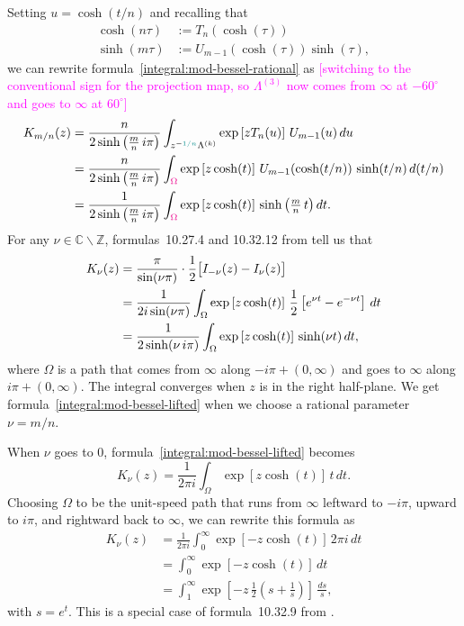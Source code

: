 \documentclass{article}
\theoremstyle{plain}
\newcommand{\Z}{\mathbb{Z}}
\newcommand{\C}{\mathbb{C}}
\begin{document}
Setting $u = \cosh(t/n)$ and recalling that
\begin{align*}
\cosh(n\tau) & := T_n(\cosh(\tau)) \\
\sinh(m\tau) & := U_{m-1}(\cosh(\tau)) \sinh(\tau),
\end{align*}
we can rewrite formula~\ref{integral:mod-bessel-rational} as \textcolor{magenta}{[switching to the conventional sign for the projection map, so $\Lambda^{(3)}$ now comes from $\infty$ at $-60^\circ$ and goes to $\infty$ at $60^\circ$]}
\begin{align}
\notag K_{m/n}(z) & = \frac{n}{2 \sinh\big(\tfrac{m}{n}\,i\pi\big)} \int_{z^{-\textcolor{DarkCyan}{1/n}}\Lambda^{(k)}} \exp\left[z T_n(u)\right]\,U_{m-1}(u)\,du \\
\notag & = \frac{n}{2 \sinh\big(\tfrac{m}{n}\,i\pi\big)} \int_{\textcolor{magenta}{\Omega}} \exp\left[z \cosh(t)\right]\,U_{m-1}(\cosh(t/n))\,\sinh(t/n)\,d(t/n) \\
\label{integral:mod-bessel-lifted} & = \frac{1}{2 \sinh\big(\tfrac{m}{n}\,i\pi\big)} \int_{\textcolor{magenta}{\Omega}} \exp\left[z \cosh(t)\right]\,\sinh\big(\tfrac{m}{n}\,t\big)\,dt.
\end{align}
For any $\nu \in \C \smallsetminus \Z$, formulas~10.27.4 and 10.32.12 from \cite{dlmf} tell us that
\begin{align}
\notag K_\nu(z) & = \frac{\pi}{\sin(\nu \pi)} \cdot \frac{1}{2}\big[ I_{-\nu}(z) - I_\nu(z) \big] \\
\notag & = \frac{1}{2i \sin(\nu \pi)} \int_\Omega \exp\left[z \cosh(t)\right]\,\frac{1}{2}\left[e^{\nu t} - e^{-\nu t}\right]\,dt \\
\label{intgral:mod-bessel-general} & = \frac{1}{2 \sinh(\nu\,i\pi)} \int_\Omega \exp\left[z \cosh(t)\right]\,\sinh(\nu t)\,dt,
\end{align}
where $\Omega$ is a path that comes from $\infty$ along $-i \pi + (0, \infty)$ and goes to $\infty$ along $i \pi + (0, \infty)$. The integral converges when $z$ is in the right half-plane. We get formula~\ref{integral:mod-bessel-lifted} when we choose a rational parameter $\nu = m/n$.

When $\nu$ goes to $0$, formula~\ref{integral:mod-bessel-lifted} becomes
\[ K_\nu(z) = \frac{1}{2\pi i} \int_\Omega \exp\left[z \cosh(t)\right]\,t\,dt. \]
Choosing $\Omega$ to be the unit-speed path that runs from $\infty$ leftward to $-i\pi$, upward to $i\pi$, and rightward back to $\infty$, we can rewrite this formula as
\begin{align*}
K_\nu(z) & = \frac{1}{2\pi i} \int_0^\infty \exp\left[-z \cosh(t)\right]\,2\pi i\,dt \\
& = \int_0^\infty \exp\left[-z \cosh(t)\right]\,dt \\
& = \int_1^\infty \exp\left[-z\,\tfrac{1}{2}\left(s + \tfrac{1}{s}\right)\right]\,\frac{ds}{s},
\end{align*}
with $s = e^t$. This is a special case of formula~10.32.9 from \cite{dlmf}.
\end{document}
